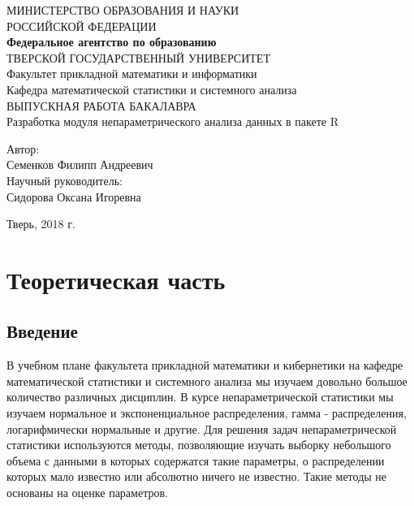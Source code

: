 \documentclass[14pt,a4paper]{scrartcl}
\begin{document}
    \begin{titlepage}
        \begin{center}
            \large
            МИНИСТЕРСТВО ОБРАЗОВАНИЯ И НАУКИ\\
            РОССИЙСКОЙ ФЕДЕРАЦИИ\\
            \textbf{Федеральное агентство по образованию\\}
            \vspace{0.5cm}
            ТВЕРСКОЙ ГОСУДАРСТВЕННЫЙ УНИВЕРСИТЕТ\\
            \vspace{0.25cm}
            Факультет прикладной математики и информатики\\
            Кафедра математической статистики и системного анализа\\
            \vfill
            \textsc{ВЫПУСКНАЯ РАБОТА БАКАЛАВРА}\\[5mm]
            {\LARGE Разработка модуля непараметрического анализа данных в пакете R\\[2mm]}
            \bigskip
        \end{center}
        \vfill
        \hfill
        \begin{minipage}{0.4\textwidth}
            Автор:\\
            Семенков Филипп Андреевич\\
            \newline
            Научный руководитель:\\
            Сидорова Оксана Игоревна\\
        \end{minipage}
        \vfill
        \begin{center}
            Тверь, 2018 г.
        \end{center}
    \end{titlepage}

    \newpage
    \tableofcontents

    \newpage
    \section{Теоретическая часть}
    \subsection{Введение}
    В учебном плане факультета прикладной математики и кибернетики на кафедре математической статистики и системного анализа мы изучаем довольно большое количество различных дисциплин. В курсе непараметрической статистики мы изучаем нормальное и экспоненциальное распределения, гамма - распределения, логарифмически нормальные и другие. Для решения задач непараметрической статистики используются методы, позволяющие изучать выборку небольшого объема с данными в которых содержатся такие параметры, о распределении которых мало известно или абсолютно ничего не известно. Такие методы не основаны на оценке параметров.
\end{document}
